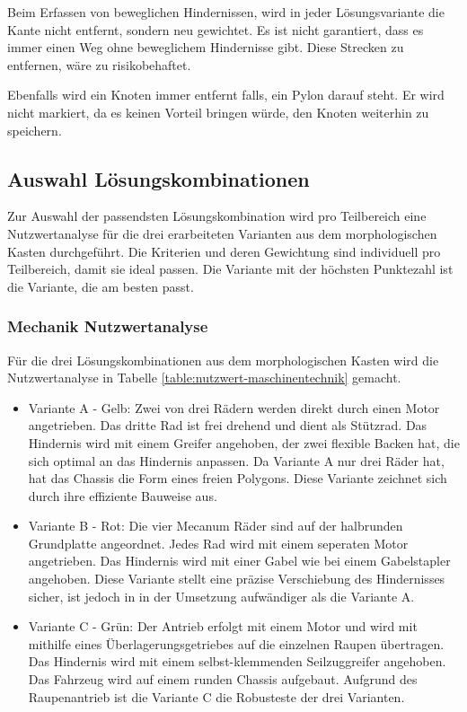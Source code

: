 Beim Erfassen von beweglichen Hindernissen, wird in jeder Lösungsvariante die Kante nicht entfernt, sondern neu gewichtet. Es ist nicht garantiert, dass es immer einen Weg ohne beweglichem Hindernisse gibt. Diese Strecken zu entfernen, wäre zu risikobehaftet.

Ebenfalls wird ein Knoten immer entfernt falls, ein Pylon darauf steht. Er wird nicht markiert, da es  keinen Vorteil bringen würde, den Knoten weiterhin zu speichern.


\newpage
\subsection*{Auswahl Lösungskombinationen}\label{nutzwertanalyse}


Zur Auswahl der passendsten Lösungskombination wird pro Teilbereich eine Nutzwertanalyse für die drei erarbeiteten Varianten aus dem morphologischen Kasten durchgeführt. Die Kriterien und deren Gewichtung sind individuell pro Teilbereich, damit sie ideal passen. Die Variante mit der höchsten Punktezahl ist die Variante, die am besten passt.

\subsubsection*{Mechanik Nutzwertanalyse}


Für die  drei Lösungskombinationen aus dem morphologischen Kasten wird die Nutzwertanalyse in Tabelle \ref{table:nutzwert-maschinentechnik} gemacht.    

\begin{itemize}
    \item Variante A - Gelb: Zwei von drei Rädern werden direkt durch einen Motor angetrieben. Das dritte Rad ist frei drehend und dient als Stützrad. Das Hindernis wird mit einem Greifer angehoben, der zwei flexible Backen hat, die sich optimal an das Hindernis anpassen. Da Variante A nur drei Räder hat, hat das Chassis die Form eines freien Polygons. Diese Variante zeichnet sich durch ihre effiziente Bauweise aus. 
    \item Variante B - Rot: Die vier Mecanum Räder sind auf der halbrunden Grundplatte angeordnet. Jedes Rad wird mit einem seperaten Motor angetrieben.  Das Hindernis wird mit einer Gabel wie bei einem Gabelstapler angehoben. Diese Variante stellt eine präzise Verschiebung des Hindernisses sicher, ist jedoch in in der Umsetzung aufwändiger als die Variante A. 
    \item Variante C - Grün: Der Antrieb erfolgt mit einem Motor und wird mit mithilfe eines Überlagerungsgetriebes auf die einzelnen Raupen übertragen.  Das Hindernis wird mit einem selbst-klemmenden Seilzuggreifer angehoben. Das Fahrzeug wird auf einem runden Chassis aufgebaut. Aufgrund des Raupenantrieb ist die Variante C die Robusteste der drei Varianten. 
\end{itemize}

